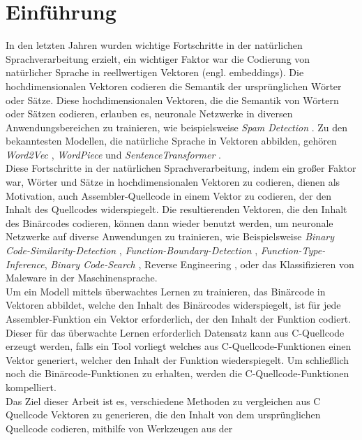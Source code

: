 \documentclass[12pt,letterpaper,ngerman]{article}
\begin{document}
\section{Einführung}
In den letzten Jahren wurden wichtige Fortschritte in der natürlichen
Sprachverarbeitung erzielt, ein wichtiger Faktor war die Codierung von
natürlicher Sprache in reellwertigen Vektoren (engl. embeddings). Die hochdimensionalen Vektoren
codieren die Semantik der ursprünglichen Wörter oder Sätze.
Diese hochdimensionalen Vektoren, die die Semantik von
Wörtern oder Sätzen codieren, erlauben es, neuronale
Netzwerke in diversen Anwendungsbereichen zu trainieren,
wie beispielsweise \textit{Spam Detection} \cite{Ball2019}.  
Zu den bekanntesten Modellen, die natürliche Sprache in Vektoren abbilden, gehören 
\textit{Word2Vec} \cite{word2vec},
\textit{WordPiece} \cite{wu2016googlesneuralmachinetranslation} und
\textit{SentenceTransformer} \cite{reimers-2019-sentence-bert}.\\
Diese Fortschritte in der natürlichen Sprachverarbeitung, indem
ein großer Faktor war, Wörter und Sätze in hochdimensionalen 
Vektoren zu codieren, dienen als Motivation, auch 
Assembler-Quellcode in einem Vektor zu codieren, der den Inhalt
des Quellcodes widerspiegelt. Die resultierenden Vektoren, die 
den Inhalt des Binärcodes codieren, können dann wieder benutzt 
werden, um neuronale Netzwerke auf diverse Anwendungen zu 
trainieren, wie Beispielsweise
\textit{Binary Code-Similarity-Detection} \cite{jtrans},
\textit{Function-Boundary-Detection} \cite{190918},
\textit{Function-Type-Inference}\cite{203650},
\textit{Binary Code-Search} \cite{9345532},
Reverse Engineering \cite{reverse-engeneering},
oder das Klassifizieren von 
Maleware in der Maschinensprache\cite{maleware-detection}.\\
Um ein Modell mittels überwachtes Lernen zu trainieren, das
Binärcode in Vektoren abbildet, welche den Inhalt des 
Binärcodes widerspiegelt, ist für jede Assembler-Funktion
ein Vektor erforderlich, der den Inhalt der Funktion codiert.
Dieser für das überwachte Lernen erforderlich Datensatz 
kann aus C-Quellcode erzeugt werden, falls ein Tool vorliegt
welches aus C-Quellcode-Funktionen einen Vektor generiert,
welcher den Inhalt der Funktion wiederspiegelt. Um schließlich 
noch die Binärcode-Funktionen zu erhalten, werden die 
C-Quellcode-Funktionen kompelliert.\\
Das Ziel dieser Arbeit ist es, verschiedene Methoden zu vergleichen
aus C Quellcode Vektoren zu generieren, die den Inhalt von dem
ursprünglichen Quellcode codieren, mithilfe von Werkzeugen aus der
\end{document}
